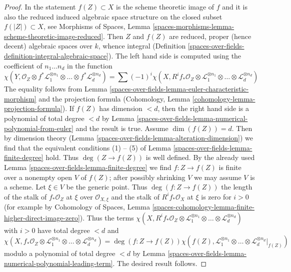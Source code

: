 \begin{proof}
In the statement $f(Z) \subset X$ is the scheme theoretic image of $f$
and it is also the reduced induced algebraic space structure on the
closed subset $f(|Z|) \subset X$, see Morphisms of Spaces, Lemma
\ref{spaces-morphisms-lemma-scheme-theoretic-image-reduced}.
Then $Z$ and $f(Z)$ are reduced, proper (hence decent) algebraic spaces
over $k$, whence integral
(Definition \ref{spaces-over-fields-definition-integral-algebraic-space}).
The left hand side is computed using the coefficient of $n_1 \ldots n_d$
in the function
$$
\chi(Y, \mathcal{O}_Z \otimes f^*\mathcal{L}_1^{\otimes n_1} \otimes
\ldots \otimes f^*\mathcal{L}_d^{\otimes n_d}) =
\sum (-1)^i
\chi(X, R^if_*\mathcal{O}_Z \otimes
\mathcal{L}_1^{\otimes n_1} \otimes \ldots \otimes
\mathcal{L}_d^{\otimes n_d})
$$
The equality follows from Lemma \ref{spaces-over-fields-lemma-euler-characteristic-morphism}
and the projection formula
(Cohomology, Lemma \ref{cohomology-lemma-projection-formula}).
If $f(Z)$ has dimension $< d$, then the right hand side
is a polynomial of total degree $< d$ by
Lemma \ref{spaces-over-fields-lemma-numerical-polynomial-from-euler}
and the result is true. Assume $\dim(f(Z)) = d$. Then
by dimension theory (Lemma \ref{spaces-over-fields-lemma-alteration-dimension})
we find that the equivalent conditions (1) -- (5) of
Lemma \ref{spaces-over-fields-lemma-finite-degree} hold. Thus
$\deg(Z \to f(Z))$ is well defined.
By the already used Lemma \ref{spaces-over-fields-lemma-finite-degree}
we find $f : Z \to f(Z)$ is finite over a nonempty open
$V$ of $f(Z)$; after possibly shrinking $V$ we may assume
$V$ is a scheme. Let $\xi \in V$ be the generic point.
Thus $\deg(f : Z \to f(Z))$ the length of the stalk of
$f_*\mathcal{O}_Z$ at $\xi$ over $\mathcal{O}_{X, \xi}$
and the stalk of $R^if_*\mathcal{O}_X$ at $\xi$ is zero for $i > 0$
(for example by Cohomology of Spaces, Lemma
\ref{spaces-cohomology-lemma-finite-higher-direct-image-zero}).
Thus the terms $\chi(X, R^if_*\mathcal{O}_Z \otimes
\mathcal{L}_1^{\otimes n_1} \otimes \ldots \otimes
\mathcal{L}_d^{\otimes n_d})$ with $i > 0$ have total
degree $< d$ and
$$
\chi(X, f_*\mathcal{O}_Z \otimes
\mathcal{L}_1^{\otimes n_1} \otimes \ldots \otimes
\mathcal{L}_d^{\otimes n_d})
=
\deg(f : Z \to f(Z)) \chi(f(Z),
\mathcal{L}_1^{\otimes n_1} \otimes \ldots \otimes
\mathcal{L}_d^{\otimes n_d}|_{f(Z)})
$$
modulo a polynomial of total degree $< d$ by
Lemma \ref{spaces-over-fields-lemma-numerical-polynomial-leading-term}.
The desired result follows.
\end{proof}

